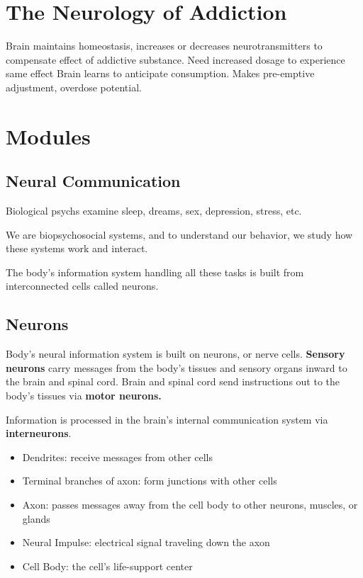 \section*{The Neurology of Addiction}
Brain maintains homeostasis, increases or decreases neurotransmitters to compensate effect of addictive substance. 
Need increased dosage to experience same effect
Brain learns to anticipate consumption. Makes pre-emptive adjustment, overdose potential.

\section*{Modules}
\subsection*{Neural Communication}
Biological psychs examine sleep, dreams, sex, depression, stress, etc.

We are biopsychosocial systems, and to understand our behavior, we study how these systems work and interact.

The body's information system handling all these tasks is built from interconnected cells called neurons. 

\subsection*{Neurons}
Body's neural information system is built on neurons, or nerve cells. \textbf{Sensory neurons} carry messages from the body's tissues and sensory organs inward to the brain and spinal cord. Brain and spinal cord send instructions out to the body's tissues via \textbf{motor neurons.}

Information is processed in the brain's internal communication system via \textbf{interneurons}. 

\begin{itemize}
  \item Dendrites: receive messages from other cells
  \item Terminal branches of axon: form junctions with other cells
  \item Axon: passes messages away from the cell body to other neurons, muscles, or glands
  \item Neural Impulse: electrical signal traveling down the axon
  \item Cell Body: the cell's life-support center
\end{itemize}

